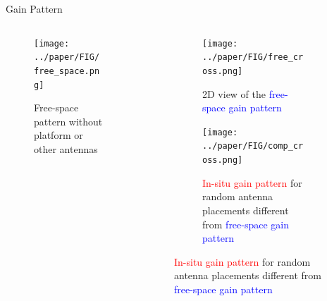 \documentclass{beamer}
\begin{document}
\begin{frame}{Gain Pattern}
    \begin{columns}
        \begin{column}{0.5\linewidth}
            \begin{figure}
                \vspace{-2.5cm}
                \centering
                \texttt{[image: ../paper/FIG/free\_space.png]}
                \caption*{\tiny Free-space pattern without platform or other antennas}
            \end{figure}
        \end{column}
        \begin{column}{0.5\linewidth}
            \begin{overlayarea}{\textwidth}{\textheight}
                \begin{figure}
                    \begin{subfigure}{\columnwidth}
                        \centering
                        \texttt{[image: ../paper/FIG/free\_cross.png]}
                        \caption*{\tiny {2D view of the \textcolor{blue}{free-space gain pattern}}}%
                    \end{subfigure}\vspace*{2mm}
                    \begin{subfigure}{\columnwidth}
                        \centering
                        \texttt{[image: ../paper/FIG/comp\_cross.png]}
                        \caption*{\tiny {\textcolor{red}{In-situ gain pattern} for random antenna placements different from \textcolor{blue}{free-space gain pattern}}}%
                    \end{subfigure}
                \end{figure}
            \end{overlayarea}
        \end{column}
    \end{columns}
\end{frame}
\end{document}
